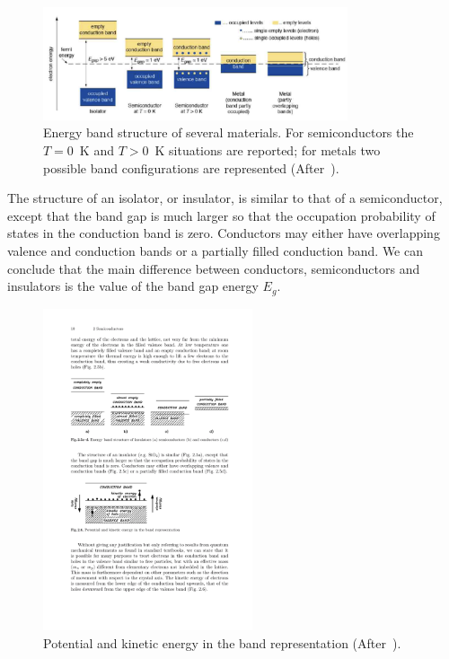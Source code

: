  
 \begin{figure}[htbp]
   \centering
   \includegraphics[width=0.8\textwidth]{EnergyBandGap.png} %
   \caption{\label{fig:EnergyBandGap}Energy band structure of several materials. For 
   semiconductors the  $T=0$~K and $T>0$~K situations are reported; for metals two 
   possible band configurations are represented (After~\cite{Krammer}).}
\end{figure}


 The structure of an isolator, or insulator, is similar to that of a semiconductor,  except that the band gap is much larger so that 
 the occupation probability of states in the conduction band is zero.   Conductors may either have 
 overlapping valence and conduction bands  or a partially filled conduction band. 
 We can conclude that the main difference between conductors, semiconductors and insulators 
 is the value of the band gap energy $E_g$.
 
 \begin{figure}[htbp]
   \centering
   \includegraphics[width=0.55\textwidth]{KinEnergy.pdf} %
   \caption{\label{fig:KinEnergy}Potential and kinetic energy in the band 
   representation (After~\cite{Lutz:411172}).}
\end{figure}

